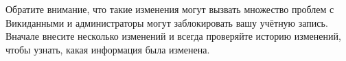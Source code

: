 Обратите внимание, 
что такие изменения могут вызвать множество проблем с Викиданными 
и администраторы могут заблокировать вашу учётную запись. 
Вначале внесите несколько изменений и всегда проверяйте историю изменений, 
чтобы узнать, какая информация была изменена.






\makeatletter
\long{}%
\makeatother
